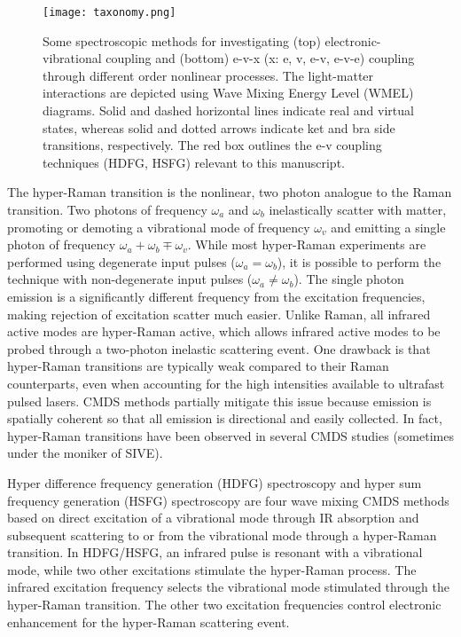 \documentclass[aip, jcp, reprint, onecolumn, nofootinbib]{revtex4-2}
\begin{document}
\begin{figure}[!htbp]
	\centering
	\texttt{[image: taxonomy.png]}
	\caption{
		Some spectroscopic methods for investigating (top) electronic-vibrational coupling and (bottom) e-v-x (x: e, v, e-v, e-v-e) coupling through different order nonlinear processes.
		The light-matter interactions are depicted using Wave Mixing Energy Level (WMEL) diagrams.\cite{RN286}
		Solid and dashed horizontal lines indicate real and virtual states, whereas solid and dotted arrows indicate ket and bra side transitions, respectively. 
		The red box outlines the e-v coupling techniques (HDFG, HSFG) relevant to this manuscript.
	} 
	\label{fig:comparisonwmel}
\end{figure}

The hyper-Raman transition is the nonlinear, two photon analogue to the Raman transition.\cite{Terhune1965, Cyvin1965, Andrews1978}
Two photons of frequency $\omega_a$ and $\omega_b$ inelastically scatter with matter, promoting or demoting a vibrational mode of frequency $\omega_v$ and emitting a single photon of frequency $\omega_a + \omega_b \mp \omega_v$. 
While most hyper-Raman experiments are performed using degenerate input pulses ($\omega_a = \omega_b$), it is possible to perform the technique with non-degenerate input pulses ($\omega_a \neq \omega_b$). \cite{Denisov1986, Kozich2007}
The single photon emission is a significantly different frequency from the excitation frequencies, making rejection of excitation scatter much easier.
Unlike Raman, all infrared active modes are hyper-Raman active, which allows infrared active modes to be probed through a two-photon inelastic scattering event. \cite{Andrews1978}
One drawback is that hyper-Raman transitions are typically weak compared to their Raman counterparts, even when accounting for the high intensities available to ultrafast pulsed lasers.\cite{RN515, Kelley2010}
CMDS methods partially mitigate this issue because emission is spatially coherent so that all emission is directional and easily collected.
In fact, hyper-Raman transitions have been observed in several CMDS studies (sometimes under the moniker of SIVE).\cite{Zilian1994, RN350, RN351, RN352, RN353, Chen1998, RN362, RN418, Hanninen2018, Wang2021, Bonn2024, McDonnell2024}

Hyper difference frequency generation (HDFG) spectroscopy and hyper sum frequency generation (HSFG) spectroscopy are four wave mixing CMDS methods based on direct excitation of a vibrational mode through IR absorption and subsequent scattering to or from the vibrational mode through a hyper-Raman transition.
In HDFG/HSFG, an infrared pulse is resonant with a vibrational mode, while two other excitations stimulate the hyper-Raman process.
The infrared excitation frequency selects the vibrational mode stimulated through the hyper-Raman transition.
The other two excitation frequencies control electronic enhancement for the hyper-Raman scattering event.
\end{document}
